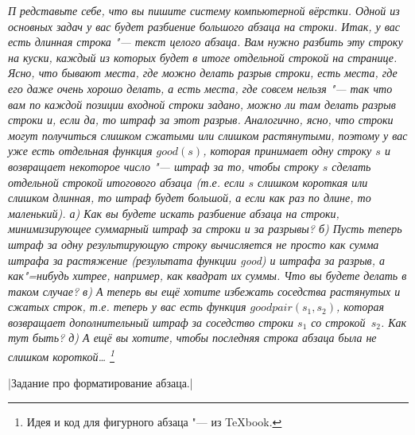 {\newlength\varunit
\newlength\firstlinehang
{
%
\parfillskip=0pt
 \circle
\it П%
%
редставьте себе, что вы пишите систему компьютерной вёрстки. Одной из основных задач у вас 
будет разбиение большого абзаца на строки. Итак, у вас есть длинная строка "--- текст целого 
абзаца. Вам нужно разбить эту строку на куски, каждый из которых будет в итоге отдельной строкой на 
странице. Ясно, что бывают места, где можно делать разрыв строки, есть места, где его даже очень 
хорошо делать, а есть места, где совсем нельзя "--- так что вам по каждой позиции входной строки 
задано, можно ли там делать разрыв строки и, если да, то штраф за этот разрыв. Аналогично, ясно, 
что строки могут получиться слишком сжатыми или слишком растянутыми, поэтому у вас уже есть 
отдельная функция $good(s)$, которая принимает одну строку $s$ и возвращает некоторое число "--- 
штраф за то, чтобы строку $s$ сделать отдельной строкой итогового абзаца (т.е. если $s$ слишком 
короткая или слишком длинная, то штраф будет большой, а если как раз по длине, то маленький). 
а) Как вы будете искать разбиение абзаца на строки, минимизирующее суммарный штраф за строки и за 
разрывы? б) Пусть теперь штраф за одну результирующую строку вычисляется не просто как сумма штрафа 
за растяжение (результата функции good) и штрафа за разрыв, а как"=нибудь хитрее, например, как 
квадрат их суммы. Что вы будете делать в таком случае? в) А теперь вы ещё хотите избежать 
соседства растянутых и сжатых строк, т.е. теперь у вас есть функция $goodpair(s_1,s_2)$, которая 
возвращает дополнительный штраф за соседство строки $s_1$ со строкой~$s_2$. Как тут быть? 
д) А ещё вы хотите, чтобы последняя строка 
абзаца была не слишком короткой\dots%
\footnote{Идея и код для фигурного абзаца "--- из \TeX book.}

}}

\let\afterwriteans\relax
\writeansno{\tsk}|Задание про форматирование абзаца.|

\vspace{0.5cm}

\vfill\pagebreak
